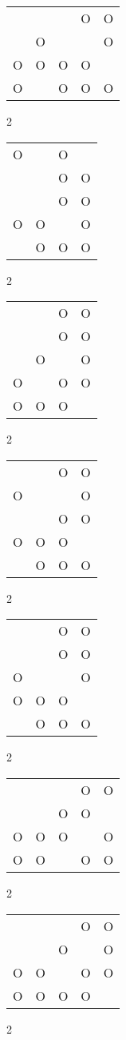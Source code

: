 \begin{tabular}{|m{0.2cm}m{0.2cm}m{0.2cm}m{0.2cm}m{0.2cm}|}\hline
 & & &O&O\\
 &O& & &O\\
O&O&O&O& \\
O& &O&O&O\\
\hline\end{tabular}2
\begin{tabular}{|m{0.2cm}m{0.2cm}m{0.2cm}m{0.2cm}|}\hline
O& &O& \\
 & &O&O\\
 & &O&O\\
O&O& &O\\
 &O&O&O\\
\hline\end{tabular}2
\begin{tabular}{|m{0.2cm}m{0.2cm}m{0.2cm}m{0.2cm}|}\hline
 & &O&O\\
 & &O&O\\
 &O& &O\\
O& &O&O\\
O&O&O& \\
\hline\end{tabular}2
\begin{tabular}{|m{0.2cm}m{0.2cm}m{0.2cm}m{0.2cm}|}\hline
 & &O&O\\
O& & &O\\
 & &O&O\\
O&O&O& \\
 &O&O&O\\
\hline\end{tabular}2
\begin{tabular}{|m{0.2cm}m{0.2cm}m{0.2cm}m{0.2cm}|}\hline
 & &O&O\\
 & &O&O\\
O& & &O\\
O&O&O& \\
 &O&O&O\\
\hline\end{tabular}2
\begin{tabular}{|m{0.2cm}m{0.2cm}m{0.2cm}m{0.2cm}m{0.2cm}|}\hline
 & & &O&O\\
 & &O&O& \\
O&O&O& &O\\
O&O& &O&O\\
\hline\end{tabular}2
\begin{tabular}{|m{0.2cm}m{0.2cm}m{0.2cm}m{0.2cm}m{0.2cm}|}\hline
 & & &O&O\\
 & &O& &O\\
O&O& &O&O\\
O&O&O&O& \\
\hline\end{tabular}2
